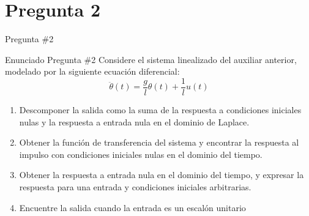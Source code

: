 \documentclass[
    10pt,
    aspectratio=169,
    xcolor={dvipsnames},
    spanish,
    ]{beamer}
\begin{document}
\section{Pregunta 2}
\begin{frame}{Pregunta \#2}
  \begin{block}{Enunciado Pregunta \#2}
   Considere el sistema linealizado del auxiliar anterior, modelado por la siguiente ecuación diferencial:
    \begin{equation}
        \ddot{\theta}(t) = \frac{g}{l} \theta(t) + \frac{1}{l} u(t)
    \end{equation}

    \begin{enumerate}
        \item Descomponer la salida como la suma de la respuesta a condiciones iniciales nulas y la respuesta a entrada nula en el dominio de Laplace.
        \item Obtener la función de transferencia del sistema y encontrar la respuesta al impulso con condiciones iniciales nulas en el dominio del tiempo.
        \item Obtener la respuesta a entrada nula en el dominio del tiempo, y expresar la respuesta para una entrada y condiciones iniciales arbitrarias.
        \item Encuentre la salida cuando la entrada es un escalón unitario
    \end{enumerate}
  \end{block}
\end{frame}
\end{document}
